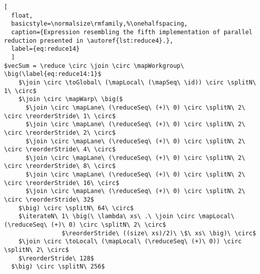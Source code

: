 \begin{lstlisting}[
  float,
  basicstyle=\normalsize\rmfamily,%\onehalfspacing,
  caption={Expression resembling the fifth implementation of parallel reduction presented in \autoref{lst:reduce4}.},
  label={eq:reduce14}
  ]
$vecSum = \reduce \circ \join \circ \mapWorkgroup\ \big(\label{eq:reduce14:1}$
    $\join \circ \toGlobal\ (\mapLocal\ (\mapSeq\ \id)) \circ \splitN\ 1\ \circ$
    $\join \circ \mapWarp\ \big($
      $\join \circ \mapLane\ (\reduceSeq\ (+)\ 0) \circ \splitN\ 2\ \circ \reorderStride\ 1\ \circ$
      $\join \circ \mapLane\ (\reduceSeq\ (+)\ 0) \circ \splitN\ 2\ \circ \reorderStride\ 2\ \circ$
      $\join \circ \mapLane\ (\reduceSeq\ (+)\ 0) \circ \splitN\ 2\ \circ \reorderStride\ 4\ \circ$
      $\join \circ \mapLane\ (\reduceSeq\ (+)\ 0) \circ \splitN\ 2\ \circ \reorderStride\ 8\ \circ$
      $\join \circ \mapLane\ (\reduceSeq\ (+)\ 0) \circ \splitN\ 2\ \circ \reorderStride\ 16\ \circ$
      $\join \circ \mapLane\ (\reduceSeq\ (+)\ 0) \circ \splitN\ 2\ \circ \reorderStride\ 32$
    $\big) \circ \splitN\ 64\ \circ$
    $\iterateN\ 1\ \big(\ \lambda\ xs\ .\ \join \circ \mapLocal\ (\reduceSeq\ (+)\ 0) \circ \splitN\ 2\ \circ$
                $\reorderStride\ ((size\ xs)/2)\ \$\ xs\ \big)\ \circ$
    $\join \circ \toLocal\ (\mapLocal\ (\reduceSeq\ (+)\ 0)) \circ \splitN\ 2\ \circ$
    $\reorderStride\ 128$
  $\big) \circ \splitN\ 256$
\end{lstlisting}
